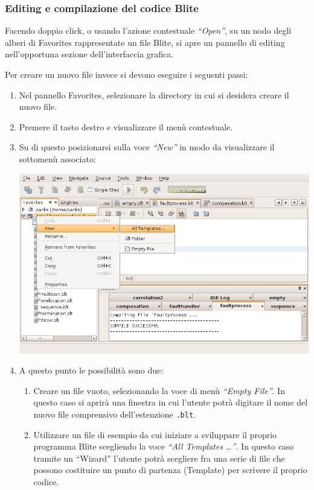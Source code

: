 \newpage

\subsubsection*{Editing e compilazione del codice Blite}
Facendo doppio click, o usando l'azione contestuale \emph{``Open''}, su un nodo
degli alberi di Favorites rappresentate un file Blite, si apre un pannello di
editing nell'opportuna sezione dell'interfaccia grafica. 

Per creare un nuovo file invece si devono eseguire i seguenti passi:

\begin{enumerate}
  \item Nel pannello Favorites, selezionare la directory in cui si desidera
  creare il nuovo file.
  \item Premere il tasto destro e visualizzare il menù contestuale.
  \item Su di questo posizionarsi sulla voce \emph{``New''} in modo da
  visualizzare il sottomenù associato:
\begin{center}
\includegraphics[scale=0.60]{blide/dia/BlideNewFile}
\end{center}
  \item A questo punto le possibilità sono due:
\begin{enumerate}
  \item Creare un file vuoto, selezionando la voce di menù \emph{``Empty
  File''}. In questo caso si aprirà una finestra in cui l'utente potrà digitare
  il nome del nuovo file comprensivo dell'estenzione \texttt{.blt}.
  \item Utilizzare un file di esempio da cui iniziare a
  sviluppare il proprio programma Blite scegliendo la voce \emph{``All
  Templates \ldots''}. In questo caso tramite un ``Wizard'' l'utente potrà
  scegliere fra una serie di file che possono costituire un punto di partenza
  (Template) per scrivere il proprio codice.
\end{enumerate} 
\end{enumerate}

